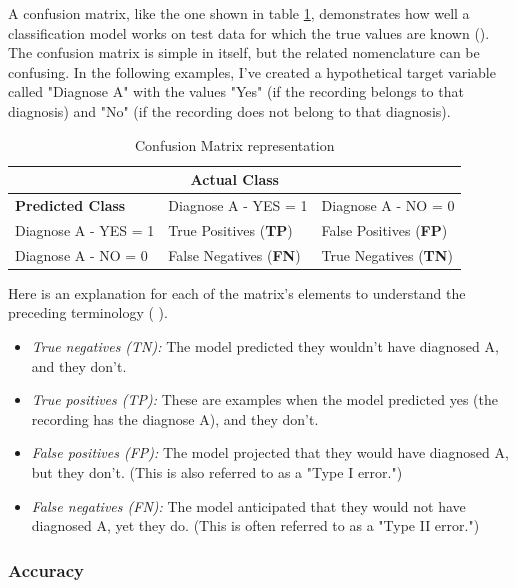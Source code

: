 A confusion matrix, like the one shown in table \ref{table:confmatr}, demonstrates how well a classification model works on test data for which the true values are known (\cite{metrics2}). The confusion matrix is simple in itself, but the related nomenclature can be confusing. In the following examples, I've created a hypothetical target variable called "Diagnose A" with the values "Yes" (if the recording belongs to that diagnosis) and "No" (if the recording does not belong to that diagnosis).


\begin{table}[H]
\centering
\begin{tabular}{ |p{4cm}||p{4cm}||p{4cm}|  }
 \hline
 \multicolumn{3}{|c|}{\textbf{Actual Class}} \\
 \hline
 \textbf{Predicted Class}  & Diagnose A - YES = 1 & Diagnose A - NO = 0\\
 \hline
 Diagnose A - YES = 1 & True Positives (\textbf{TP})  & False Positives (\textbf{FP}) \\
 Diagnose A - NO = 0 & False Negatives (\textbf{FN})  & True Negatives (\textbf{TN}) \\
 \hline
\end{tabular}
\caption{Confusion Matrix representation}
\label{table:confmatr}
\end{table}

Here is an explanation for each of the matrix's elements to understand the preceding terminology (\cite{metrics2} \cite{metrics1}).

\begin{itemize}
    \item \textit{True negatives (TN):} The model predicted they wouldn't have diagnosed A, and they don't.
    \item \textit{True positives (TP):} These are examples when the model predicted yes (the recording has the diagnose A), and they don't.
    \item \textit{False positives (FP):} The model projected that they would have diagnosed A, but they don't. (This is also referred to as a "Type I error.")
    \item \textit{False negatives (FN):} The model anticipated that they would not have diagnosed A, yet they do. (This is often referred to as a "Type II error.")
\end{itemize}

\subsubsection{Accuracy} \label{4accuracy}

